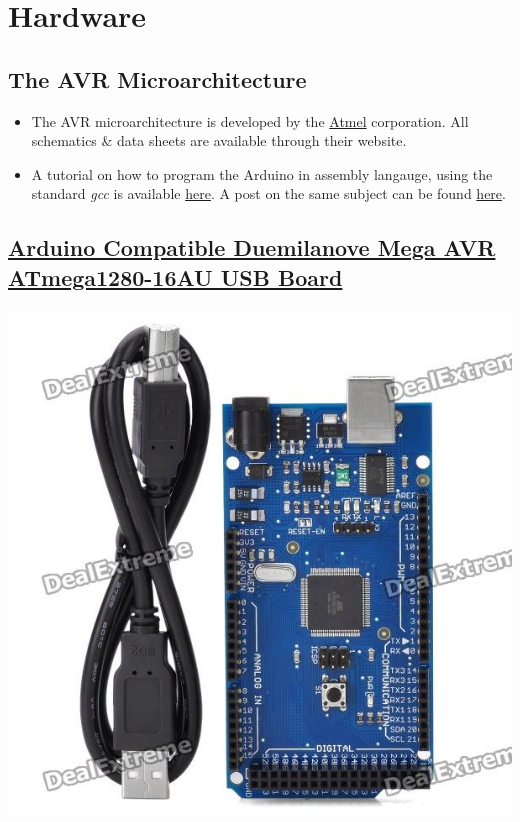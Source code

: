 \documentclass[11pt]{article}
\begin{document}
\section{Hardware}
\label{sec-4}

\subsection{The AVR Microarchitecture}
\label{sec-4-1}

\begin{itemize}
\item The AVR microarchitecture is developed by the \href{http://www.atmel.com/}{Atmel} corporation. All schematics \& data sheets are available through their website.
\item A tutorial on how to program the Arduino in assembly langauge, using the standard \emph{gcc} is available \href{http://www.nongnu.org/avr-libc/user-manual/inline_asm.html}{here}. A post on the same subject can be found \href{http://blog.threebytesfull.com/post/6475041619/arduino-avr-assembly-language}{here}.
\end{itemize}
\subsection{\href{http://dx.com/p/arduino-duemilanove-mega-avr-atmega1280-16au-usb-board-118042}{Arduino Compatible Duemilanove Mega AVR ATmega1280-16AU USB Board}}
\label{sec-4-2}

\includegraphics[width=.9\linewidth]{./files/sku_118042_1.jpg}
\end{document}

